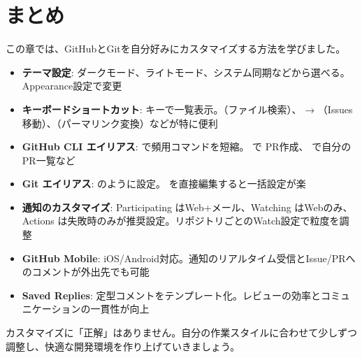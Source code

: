 \section{まとめ}

この章では、GitHubとGitを自分好みにカスタマイズする方法を学びました。

\begin{itemize}
  \item \textbf{テーマ設定}: ダークモード、ライトモード、システム同期などから選べる。Appearance設定で変更
  \item \textbf{キーボードショートカット}:  キーで一覧表示。（ファイル検索）、 → （Issues移動）、（パーマリンク変換）などが特に便利
  \item \textbf{GitHub CLI エイリアス}:  で頻用コマンドを短縮。 で PR作成、 で自分のPR一覧など
  \item \textbf{Git エイリアス}:  のように設定。 を直接編集すると一括設定が楽
  \item \textbf{通知のカスタマイズ}: Participating はWeb+メール、Watching はWebのみ、Actions は失敗時のみが推奨設定。リポジトリごとのWatch設定で粒度を調整
  \item \textbf{GitHub Mobile}: iOS/Android対応。通知のリアルタイム受信とIssue/PRへのコメントが外出先でも可能
  \item \textbf{Saved Replies}: 定型コメントをテンプレート化。レビューの効率とコミュニケーションの一貫性が向上
\end{itemize}

カスタマイズに「正解」はありません。自分の作業スタイルに合わせて少しずつ調整し、快適な開発環境を作り上げていきましょう。
